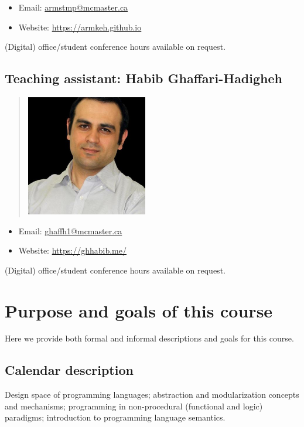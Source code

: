 \documentclass[11pt]{article}
\theoremstyle{definition}
\begin{document}
\begin{itemize}
\item Email: \href{mailto:armstmp@mcmaster.ca}{armstmp@mcmaster.ca}
\item Website: \url{https://armkeh.github.io}
\end{itemize}

(Digital) office/student conference hours available on request.

\subsection{Teaching assistant: Habib Ghaffari-Hadigheh}
\label{sec:orgee9af86}
\begin{quote}
\includegraphics[width=200px]{./media/habibghaffarihadigheh.jpg}
\end{quote}

\begin{itemize}
\item Email: \href{mailto:ghaff1@mcmaster.ca}{ghaffh1@mcmaster.ca}
\item Website: \url{https://ghhabib.me/}
\end{itemize}

(Digital) office/student conference hours available on request.

\section{Purpose and goals of this course}
\label{sec:orgbb231f4}
Here we provide both formal and informal descriptions
and goals for this course.

\subsection{Calendar description}
\label{sec:org4ca375d}
Design space of programming languages;
abstraction and modularization concepts and mechanisms;
programming in non-procedural (functional and logic) paradigms;
introduction to programming language semantics.
\end{document}

